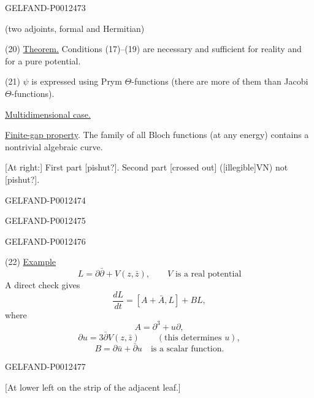 \begin{GelfandAdjacentEvidence}{GELFAND-P001247}{3}


(two adjoints, formal and Hermitian)

(20) \underline{Theorem.} Conditions (17)–(19) are necessary and sufficient for reality and for a pure potential.

(21) $\psi$ is expressed using Prym $\Theta$-functions (there are more of them than Jacobi $\Theta$-functions).

\underline{Multidimensional case.}

\underline{Finite-gap property}. The family of all Bloch functions (at any energy) contains a nontrivial algebraic curve.

[At right:] First part [pishut?]. Second part [crossed out] ([illegible]VN) not [pishut?].
\end{GelfandAdjacentEvidence}
\begin{GelfandAdjacentEvidence}{GELFAND-P001247}{4}

\end{GelfandAdjacentEvidence}
\begin{GelfandAdjacentEvidence}{GELFAND-P001247}{5}

\end{GelfandAdjacentEvidence}
\begin{GelfandAdjacentEvidence}{GELFAND-P001247}{6}


(22) \underline{Example}
\begin{equation*}
L=\partial\bar\partial+V(z,\bar z),\qquad V\text{ is a real potential}
\end{equation*}
A direct check gives
\begin{equation*}
\frac{dL}{dt}=[A+\bar A,L]+BL,
\end{equation*}
where
\begin{equation*}
A=\partial^3+u\partial,
\end{equation*}
\begin{equation*}
\partial u=3\bar\partial V(z,\bar z)\qquad(\text{this determines }u),
\end{equation*}
\begin{equation*}
B=\partial\bar u+\bar\partial u\quad\text{is a scalar function}.
\end{equation*}
\end{GelfandAdjacentEvidence}
\begin{GelfandAdjacentEvidence}{GELFAND-P001247}{7}


[At lower left on the strip of the adjacent leaf.]
\end{GelfandAdjacentEvidence}



